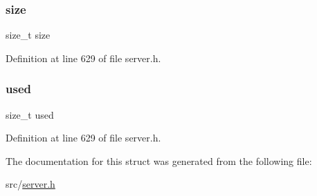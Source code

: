 \subsubsection{\texorpdfstring{size}{size}}
{\footnotesize\ttfamily size\+\_\+t size}



Definition at line 629 of file server.\+h.

\mbox{\label{structclient_reply_block_ae8cc011bf3ee2d3c19743095ffc0f7a5}} 
\subsubsection{\texorpdfstring{used}{used}}
{\footnotesize\ttfamily size\+\_\+t used}



Definition at line 629 of file server.\+h.



The documentation for this struct was generated from the following file\+:\begin{DoxyCompactItemize}
\item 
src/\hyperlink{server_8h}{server.\+h}\end{DoxyCompactItemize}
